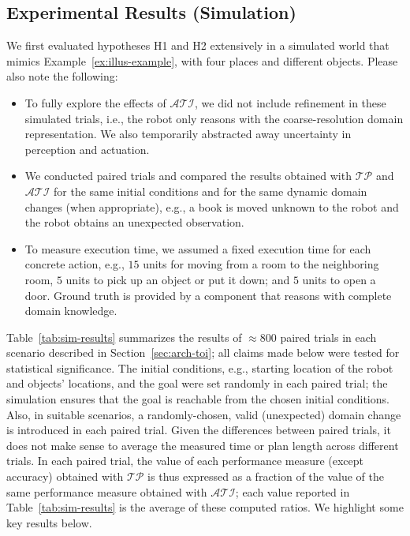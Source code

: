 \documentclass[letterpaper, 10 pt, conference]{article}  %
\begin{document}
\subsection{Experimental Results (Simulation)}
\label{sec:expres-sim}
We first evaluated hypotheses H1 and H2 extensively in a simulated
world that mimics Example~\ref{ex:illus-example}, with four places and
different objects. Please also note the following:
\begin{itemize}
\item To fully explore the effects of $\mathcal{ATI}$, we did not
  include refinement in these simulated trials, i.e., the robot only
  reasons with the coarse-resolution domain representation. We also
  temporarily abstracted away uncertainty in perception and actuation.

\item We conducted paired trials and compared the results obtained
  with $\mathcal{TP}$ and $\mathcal{ATI}$ for the same initial
  conditions and for the same dynamic domain changes (when
  appropriate), e.g., a book is moved unknown to the robot and the
  robot obtains an unexpected observation.

\item To measure execution time, we assumed a fixed execution time for
  each concrete action, e.g., $15$ units for moving from a room to the
  neighboring room, $5$ units to pick up an object or put it down; and
  $5$ units to open a door. Ground truth is provided by a component
  that reasons with complete domain knowledge.
\end{itemize}
Table~\ref{tab:sim-results} summarizes the results of $\approx 800$
paired trials in each scenario described in
Section~\ref{sec:arch-toi}; all claims made below were tested for
statistical significance. The initial conditions, e.g., starting
location of the robot and objects' locations, and the goal were set
randomly in each paired trial; the simulation ensures that the goal is
reachable from the chosen initial conditions. Also, in suitable
scenarios, a randomly-chosen, valid (unexpected) domain change is
introduced in each paired trial. Given the differences between paired
trials, it does not make sense to average the measured time or plan
length across different trials. In each paired trial, the value of
each performance measure (except accuracy) obtained with
$\mathcal{TP}$ is thus expressed as a fraction of the value of the
same performance measure obtained with $\mathcal{ATI}$; each value
reported in Table~\ref{tab:sim-results} is the average of these
computed ratios. We highlight some key results below.
\end{document}
